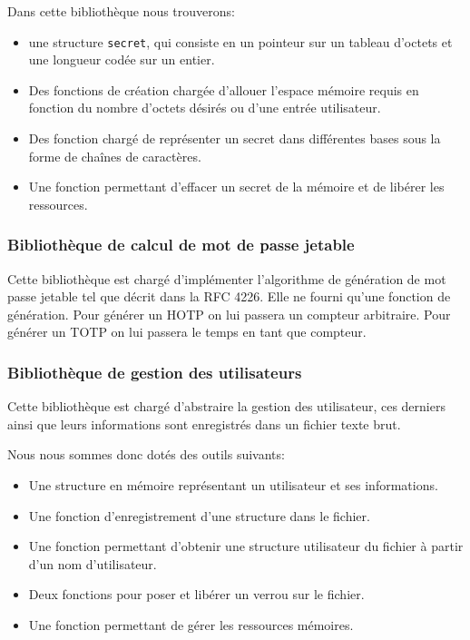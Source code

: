 Dans cette bibliothèque nous trouverons:
\begin{itemize}
  \item une structure \verb?secret?, qui consiste en un pointeur sur un tableau
  d'octets et une longueur codée sur un entier.
  \item Des fonctions de création chargée d'allouer l'espace mémoire requis en
  fonction du nombre d'octets désirés ou d'une entrée utilisateur.
  \item Des fonction chargé de représenter un secret dans différentes bases
  sous la forme de chaînes de caractères.
  \item Une fonction permettant d'effacer un secret de la mémoire et de
  libérer les ressources.
\end{itemize}

\subsubsection{Bibliothèque de calcul de mot de passe jetable}
Cette bibliothèque est chargé d'implémenter l'algorithme de génération de mot
passe jetable tel que décrit dans la RFC 4226\cite{HOTPrfc}. Elle ne fourni
qu'une fonction de génération. Pour générer un HOTP on lui passera un compteur
arbitraire. Pour générer un TOTP on lui passera le temps en tant que compteur.

\subsubsection{Bibliothèque de gestion des utilisateurs}
Cette bibliothèque est chargé d'abstraire la gestion des utilisateur, ces
derniers ainsi que leurs informations sont enregistrés dans un fichier texte
brut.

Nous nous sommes donc dotés des outils suivants:
\begin{itemize}
  \item Une structure en mémoire représentant un utilisateur et ses
  informations.
  \item Une fonction d'enregistrement d'une structure dans le fichier.
  \item Une fonction permettant d'obtenir une structure utilisateur du fichier
  à partir d'un nom d'utilisateur.
  \item Deux fonctions pour poser et libérer un verrou sur le fichier.
  \item Une fonction permettant de gérer les ressources mémoires.\\
\end{itemize}

